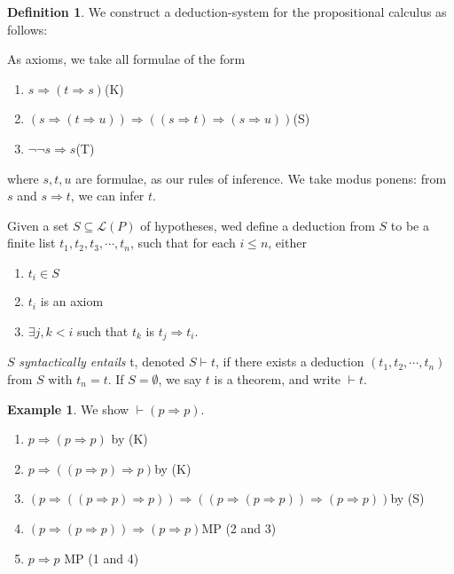 \documentclass[a4paper]{article}
\theoremstyle{definition}
\newtheorem*{defi}{Definition}
\newtheorem*{eg}{Example}
\newcommand{\La}{\mathcal{L}}
\begin{document}
\begin{defi}
  We construct a deduction-system for the propositional calculus as follows:

  As axioms, we take all formulae of the form
  \begin{enumerate}
  \item $s\Rightarrow (t\Rightarrow s)$\hfill(K)
  \item $(s\Rightarrow (t\Rightarrow u)) \Rightarrow ((s\Rightarrow t)\Rightarrow (s\Rightarrow u))$\hfill(S)
  \item $\neg \neg s\Rightarrow s$\hfill (T)
  \end{enumerate}
  where $s, t, u$ are formulae, as our rules of inference. We take modus ponens: from $s$ and $s\Rightarrow t$, we can infer $t$.

  Given a set $S\subseteq \La(P)$ of hypotheses, wed define a deduction from $S$ to be a finite list $t_1, t_2, t_3, \cdots, t_n$, such that for each $i\leq n$, either
  \begin{enumerate}
  \item $t_i\in S$
  \item $t_i$ is an axiom
  \item $\exists j, k < i$ such that $t_k$ is $t_j\Rightarrow t_i$.
  \end{enumerate}

  $S$ \emph{syntactically entails} t, denoted $S\vdash t$, if there exists a deduction $(t_1, t_2, \cdots, t_n)$ from $S$ with $t_n = t$. If $S=\emptyset$, we say $t$ is a theorem, and write $\vdash t$.
\end{defi}

\begin{eg}
  We show $\vdash (p\Rightarrow p)$.
  \begin{enumerate}[label=\arabic{*}.]
  \item $p\Rightarrow (p \Rightarrow p)$ \hfill by (K)
  \item $p\Rightarrow ((p\Rightarrow p)\Rightarrow p)$\hfill by (K)
  \item $(p\Rightarrow ((p\Rightarrow p)\Rightarrow p)) \Rightarrow ((p\Rightarrow (p\Rightarrow p))\Rightarrow (p\Rightarrow p))$\hfill by (S)
  \item $(p\Rightarrow(p\Rightarrow p))\Rightarrow (p\Rightarrow p)$\hfill MP (2 and 3)
  \item $p\Rightarrow p$ \hfill MP (1 and 4)
  \end{enumerate}
\end{eg}
\end{document}
